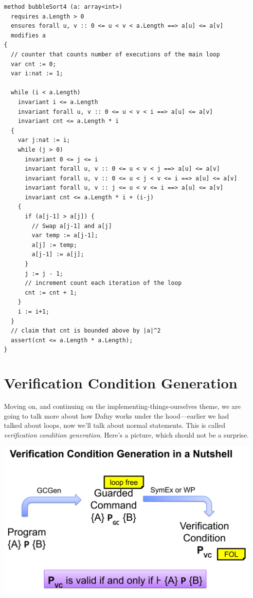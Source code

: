 \documentclass[11pt]{article}
\begin{document}
\begin{lstlisting}[language=dafny]
method bubbleSort4 (a: array<int>)
  requires a.Length > 0
  ensures forall u, v :: 0 <= u < v < a.Length ==> a[u] <= a[v]
  modifies a
{
  // counter that counts number of executions of the main loop
  var cnt := 0;
  var i:nat := 1;

  while (i < a.Length)
    invariant i <= a.Length
    invariant forall u, v :: 0 <= u < v < i ==> a[u] <= a[v]
    invariant cnt <= a.Length * i
  {
    var j:nat := i;
    while (j > 0)
      invariant 0 <= j <= i
      invariant forall u, v :: 0 <= u < v < j ==> a[u] <= a[v]
      invariant forall u, v :: 0 <= u < j < v <= i ==> a[u] <= a[v]
      invariant forall u, v :: j <= u < v <= i ==> a[u] <= a[v]
      invariant cnt <= a.Length * i + (i-j)
    {
      if (a[j-1] > a[j]) {
        // Swap a[j-1] and a[j]
        var temp := a[j-1];
        a[j] := temp;
        a[j-1] := a[j];
      }
      j := j - 1;
      // increment count each iteration of the loop
      cnt := cnt + 1;
    }
    i := i+1;
  }
  // claim that cnt is bounded above by |a|^2
  assert(cnt <= a.Length * a.Length);
}
\end{lstlisting}

\section*{Verification Condition Generation}
Moving on, and continuing on the implementing-things-ourselves theme,
we are going to talk more about how Dafny works under the
hood---earlier we had talked about loops, now we'll talk about normal
statements. This is called \emph{verification condition
generation}. Here's a picture, which should not be a surprise.

\includegraphics[width=\textwidth]{L17/vcgen.png}
\end{document}
